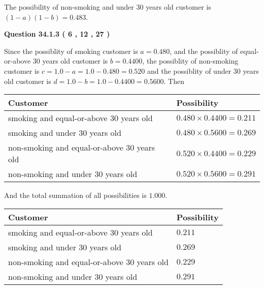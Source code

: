 \documentclass[12pt]{article}
\begin{document}
 
 
 
 
\noindent{}

The possibility of  %
 non-smoking and  %
under 30 years old
customer is $ (1-a)(1-b) =  %
0.483 $.
 
 
  
\vspace{0.2in}
  
{\textbf{\Large{Question
34.1.3 
 (           6 ,          12 ,          27 )
}}}
  
  
 
 
\noindent{}

Since the possiblity of  %
smoking customer is $ a =  %
0.480 $,
and the possiblity of  %
equal-or-above 30 years old customer is $ b =  %
0.4400 $,
the possiblity of  %
non-smoking customer is $ c = 1.0 - a = 1.0 -
0.480
=  %
0.520 $ and the possiblity of  %
under 30 years old
customer is $ d = 1.0 - b = 1.0 -  %
0.4400 =  %
0.5600  $.
Then
 
\noindent
\begin{tabular}{|l|l|}
\hline
Customer & Possibility \\
\hline
smoking  and  %
equal-or-above 30 years old  &
  $ %
0.480 \times  %
0.4400 =  %
0.211$ \\
\hline
smoking  and  %
under 30 years old &
  $ %
0.480 \times  %
0.5600 =  %
0.269$ \\
\hline
 non-smoking and  %
equal-or-above 30 years old  &
  $ %
0.520 \times  %
0.4400 =  %
0.229$ \\
\hline
 non-smoking and  %
under 30 years old &
  $ %
0.520 \times  %
0.5600 =  %
0.291$ \\
\hline
\end{tabular}
 
\noindent
And the total summation of all possibilities is $  %
1.000 $.
 
 
 
 
 
 
\noindent{}

 
\noindent
\begin{tabular}{|l|l|}
\hline
Customer & Possibility \\
\hline
smoking  and  %
equal-or-above 30 years old &
  $ %
0.211$ \\
\hline
smoking  and  %
under 30 years old &
  $ %
0.269$ \\
\hline
 non-smoking and  %
equal-or-above 30 years old &
  $ %
0.229$ \\
\hline
 non-smoking and  %
under 30 years old &
  $ %
0.291$ \\
\hline
\end{tabular}
 
\end{document}
